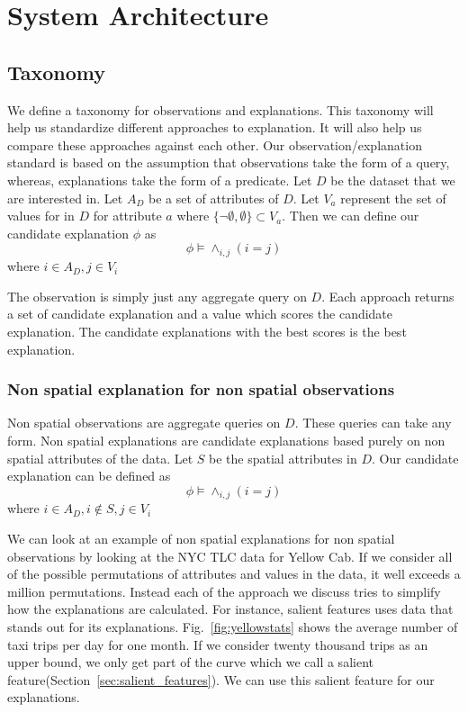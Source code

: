 \chapter{System Architecture}
\label{chp:architecture}
\section{Taxonomy}
\label{sec:taxonomy}
We define a taxonomy for observations and explanations. This taxonomy will help us standardize different approaches to explanation. It will also help us compare these approaches against each other. Our observation/explanation standard is based on the assumption that observations take the form of a query, whereas, explanations take the form of a predicate. Let $D$ be the dataset that we are interested in. Let $A_D$ be a set of attributes of $D$. Let $V_a$ represent the set of values for in $D$ for attribute $a$ where $\{\neg \emptyset,\emptyset\} \subset V_a$. Then we can define our candidate explanation $\phi$ as $$\phi \models \wedge_{i,j} {(i=j)}$$ where $i \in A_D, j \in V_i $

The observation is simply just any aggregate query on $D$. Each approach returns a set of candidate explanation and a value which scores the candidate explanation. The candidate explanations with the best scores is the best explanation.

\subsection{Non spatial explanation for non spatial observations}
\label{sec:nonspatial_nonspatial}

Non spatial observations are aggregate queries on $D$. These queries can take any form. Non spatial explanations are candidate explanations based purely on non spatial attributes of the data. Let $S$ be the spatial attributes in $D$. Our candidate explanation can be defined as 
$$\phi \models \wedge_{i,j} {(i=j)}$$
where $i \in A_D, i \notin S, j \in V_i$

We can look at an example of non spatial explanations for non spatial observations by looking at the NYC TLC data for Yellow Cab. If we consider all of the possible permutations of attributes and values in the data, it well exceeds a million permutations. Instead each of the approach we discuss tries to simplify how the explanations are calculated. For instance, salient features uses data that stands out for its explanations. Fig.~\ref{fig:yellowstats} shows the average number of taxi trips per day for one month. If we consider twenty thousand trips as an upper bound, we only get part of the curve which we call a salient feature(Section~\ref{sec:salient_features}). We can use this salient feature for our explanations. 


